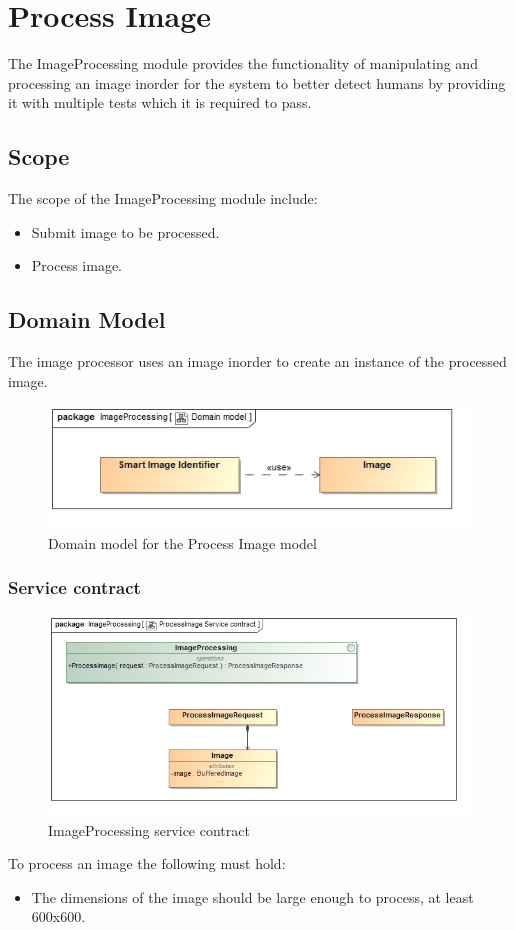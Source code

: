 \documentclass[a4paper,12pt]{report}
\begin{document}
\section {Process Image}
The ImageProcessing module provides the functionality of manipulating and processing an image inorder for the system to better detect  humans by providing it with multiple tests which it is required to pass.
	\FloatBarrier
	\subsection {Scope}
		The scope of the ImageProcessing module include:
			\begin {itemize}
				\item Submit image to be processed.
				\item Process image.
			\end {itemize}

	\FloatBarrier
	\subsection {Domain Model}
		The image processor uses an image inorder to create an instance of the processed image.
		\begin{figure}[htb]
			\centering
			\includegraphics [scale=0.5]{../Diagrams/ProcessImage_Domain_model.jpg}
			\caption{Domain model for the Process Image model}
		\end{figure}	

		\FloatBarrier
		\subsubsection {Service contract}
			\begin{figure}[htb]
				\centering
				\includegraphics [scale=0.5]{../Diagrams/ProcessImage_Service_contract.jpg}
				\caption{ImageProcessing service contract}
			\end{figure}	
			To process an image the following must hold:
			\begin {itemize}
				\item The dimensions of the image should be large enough to process, at least 600x600.
			\end {itemize}
\end{document}
